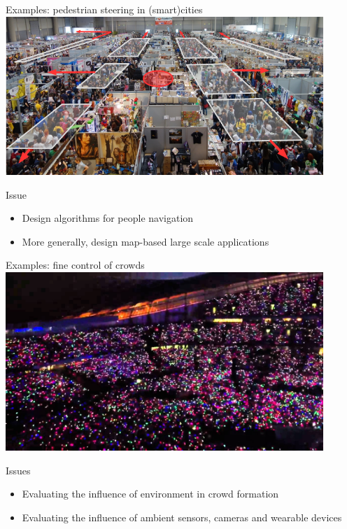 \documentclass[presentation, 8pt]{beamer}\mode<presentation>{\usetheme{AMSBolognaFC}}
\begin{document}
\begin{frame}{Examples: pedestrian steering in (smart)cities}
\includegraphics[width=0.9\textwidth]{img/pedastrian.png}
\begin{alertblock}{Issue}
	\begin{itemize}
		\item Design  algorithms for people navigation
		\item More generally, design map-based large scale applications
	\end{itemize}
\end{alertblock}
\end{frame}
\begin{frame}{Examples: fine control of crowds}
\centering
\includegraphics[width=0.9\textwidth]{img/coldplay}
\begin{alertblock}{Issues}
	\begin{itemize}
		\item Evaluating the influence of environment in crowd formation
		\item Evaluating the influence of ambient sensors, cameras and wearable
		devices
	\end{itemize}
\end{alertblock}
\end{frame}
\end{document}
